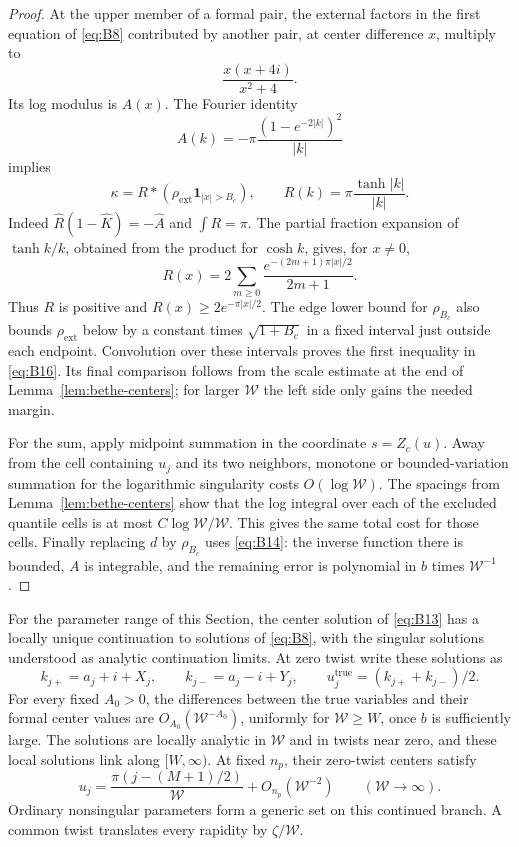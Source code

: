 \begin{proof}
At the upper member of a formal pair, the external factors in the first
equation of \eqref{eq:B8} contributed by another pair, at center
difference $x$, multiply to
\[
 \frac{x(x+4i)}{x^2+4}.
\]
Its log modulus is $A(x)$.  The Fourier identity
\[
 \widehat A(k)=-\pi\frac{(1-e^{-2|k|})^2}{|k|}
\]
implies
\[
 \kappa=R*(\rho_{\mathrm{ext}}\mathbf1_{|x|>B_c}),
 \qquad \widehat R(k)=\pi\frac{\tanh|k|}{|k|}.
\]
Indeed $\widehat R(1-\widehat K)=-\widehat A$ and $\int R=\pi$.
The partial fraction expansion of $\tanh k/k$, obtained from the product
for $\cosh k$, gives, for $x\ne0$,
\[
 R(x)=2\sum_{m\geq0}
          \frac{e^{-(2m+1)\pi|x|/2}}{2m+1}.
\]
Thus $R$ is positive and $R(x)\geq2e^{-\pi|x|/2}$.  The edge lower bound
for $\rho_{B_c}$ also bounds $\rho_{\mathrm{ext}}$ below by a constant
times $\sqrt{1+B_c}$ in a fixed interval just outside each endpoint.
Convolution over these intervals proves the first inequality in
\eqref{eq:B16}.  Its final comparison follows from the scale estimate
at the end of Lemma~\ref{lem:bethe-centers}; for larger $\mathcal W$ the
left side only gains the needed margin.

For the sum, apply midpoint summation in the coordinate $s=Z_c(u)$.
Away from the cell containing $u_j$ and its two neighbors, monotone or
bounded-variation summation for the logarithmic singularity costs
$O(\log\mathcal W)$.  The spacings from
Lemma~\ref{lem:bethe-centers} show that the log integral over each of
the excluded quantile cells is at most
$C\log\mathcal W/\mathcal W$.  This gives the same total cost for those
cells.  Finally replacing $d$ by $\rho_{B_c}$ uses \eqref{eq:B14}:
the inverse function there is bounded, $A$ is integrable, and the
remaining error is polynomial in $b$ times $\mathcal W^{-1}$.
\end{proof}

\begin{lemma}\label{lem:bethe-roots}
For the parameter range of this Section, the center solution of
\eqref{eq:B13} has a locally unique continuation to solutions of
\eqref{eq:B8}, with the singular solutions understood as analytic
continuation limits.  At zero twist write these solutions as
\[
 k_{j+}=a_j+i+X_j,\qquad k_{j-}=a_j-i+Y_j,
 \qquad u_j^{\mathrm{true}}=(k_{j+}+k_{j-})/2.
\]
For every fixed $A_0>0$, the differences between the true variables and
their formal center values are $O_{A_0}(\mathcal W^{-A_0})$, uniformly
for $\mathcal W\geq W$, once $b$ is sufficiently large.  The solutions
are locally analytic in $\mathcal W$ and in twists near zero, and these
local solutions link along $[W,\infty)$.  At fixed $n_p$, their zero-twist
centers satisfy
\begin{equation}\label{eq:B18}
 u_j=\frac{\pi(j-(M+1)/2)}{\mathcal W}
             +O_{n_p}(\mathcal W^{-2})
       \qquad (\mathcal W\to\infty).
\end{equation}
Ordinary nonsingular parameters form a generic set on this continued
branch.  A common twist translates every rapidity by $\zeta/\mathcal W$.
\end{lemma}

